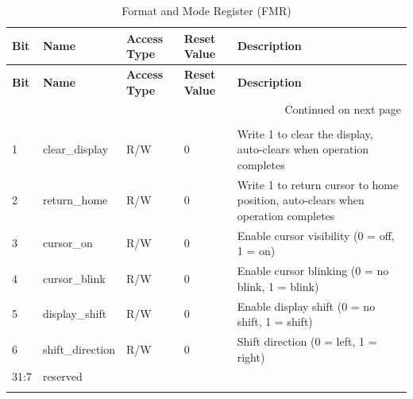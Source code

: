     \begin{longtable}{|p{1cm}|p{3cm}|p{2cm}|p{1cm}|p{6.25cm}|}
        \hline
        \textbf{Bit} & \textbf{Name} & \textbf{Access Type} & \textbf{Reset Value} & \textbf{Description} \\
        \hline
        \endfirsthead
        \hline
        \textbf{Bit} & \textbf{Name} & \textbf{Access Type} & \textbf{Reset Value} & \textbf{Description} \\
        \hline
        \endhead
        \hline \multicolumn{5}{|r|}{{Continued on next page}} \\ \hline
        \endfoot
        \hline
        \endlastfoot

        \multicolumn{5}{|c|}{\textbf{0x2C DFR - Display Format Register}} \\
        \hline
        1 & clear\_display & R/W & 0 & Write 1 to clear the display, auto-clears when operation completes \\
        \hline
        2 & return\_home & R/W & 0 & Write 1 to return cursor to home position, auto-clears when operation completes \\
        \hline
        3 & cursor\_on & R/W & 0 & Enable cursor visibility (0 = off, 1 = on) \\
        \hline
        4 & cursor\_blink & R/W & 0 & Enable cursor blinking (0 = no blink, 1 = blink) \\
        \hline
        5 & display\_shift & R/W & 0 & Enable display shift (0 = no shift, 1 = shift) \\
        \hline
        6 & shift\_direction & R/W & 0 & Shift direction (0 = left, 1 = right) \\
        \hline
        31:7 & reserved & & & \\
        \hline
        \caption{Format and Mode Register (FMR)}
        \label{tab:fmr}
        \end{longtable}
